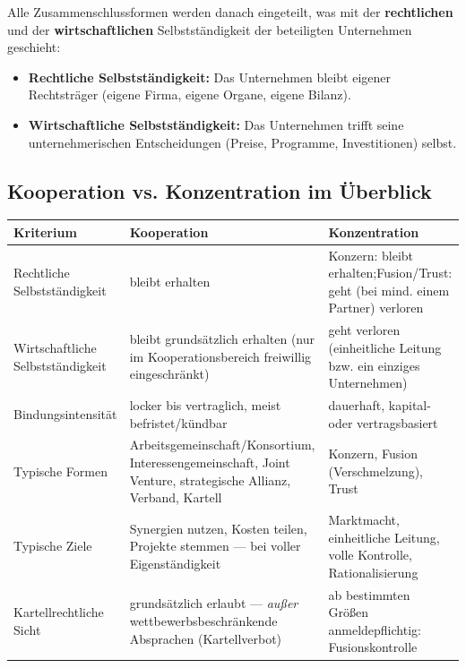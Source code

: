 \documentclass[11pt, a4paper]{article}
\begin{document}
Alle Zusammenschlussformen werden danach eingeteilt, was mit der
\textbf{rechtlichen} und der \textbf{wirtschaftlichen} Selbstständigkeit der beteiligten
Unternehmen geschieht:

\begin{itemize}
  \item \textbf{Rechtliche Selbstständigkeit:} Das Unternehmen bleibt eigener
    Rechtsträger (eigene Firma, eigene Organe, eigene Bilanz).
  \item \textbf{Wirtschaftliche Selbstständigkeit:} Das Unternehmen trifft seine
    unternehmerischen Entscheidungen (Preise, Programme, Investitionen) selbst.
\end{itemize}

\subsection{Kooperation vs. Konzentration im Überblick}

\begin{center}
\begin{tabular}{p{4.2cm} p{4.9cm} p{4.9cm}}
\toprule
\textbf{Kriterium} & \textbf{Kooperation} & \textbf{Konzentration}\\
\midrule
Rechtliche Selbstständigkeit & bleibt erhalten & Konzern: bleibt erhalten;\newline Fusion/Trust: geht (bei mind. einem Partner) verloren\\
\addlinespace[3pt]
Wirtschaftliche Selbstständigkeit & bleibt grundsätzlich erhalten (nur im Kooperationsbereich freiwillig eingeschränkt) & geht verloren (einheitliche Leitung bzw. ein einziges Unternehmen)\\
\addlinespace[3pt]
Bindungsintensität & locker bis vertraglich, meist befristet/kündbar & dauerhaft, kapital- oder vertragsbasiert\\
\addlinespace[3pt]
Typische Formen & Arbeitsgemeinschaft/Konsortium, Interessengemeinschaft, Joint Venture, strategische Allianz, Verband, Kartell & Konzern, Fusion (Verschmelzung), Trust\\
\addlinespace[3pt]
Typische Ziele & Synergien nutzen, Kosten teilen, Projekte stemmen --- bei voller Eigenständigkeit & Marktmacht, einheitliche Leitung, volle Kontrolle, Rationalisierung\\
\addlinespace[3pt]
Kartellrechtliche Sicht & grundsätzlich erlaubt --- \emph{außer} wettbewerbsbeschränkende Absprachen (Kartellverbot) & ab bestimmten Größen anmeldepflichtig: Fusionskontrolle\\
\bottomrule
\end{tabular}
\end{center}
\end{document}
